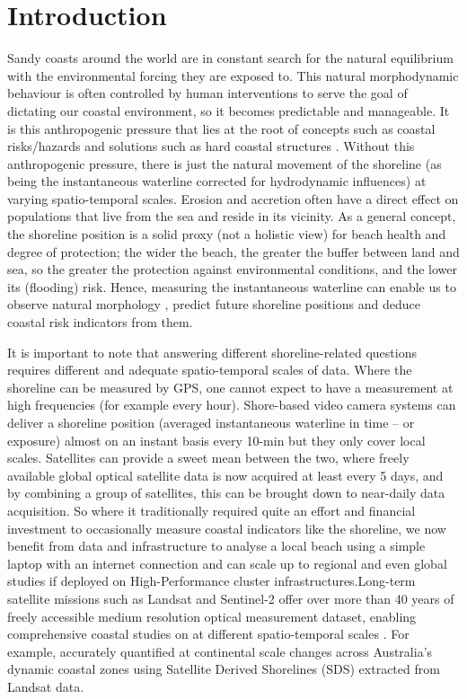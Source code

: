 \documentclass[remotesensing,technicalnote,submit,pdftex,moreauthors]{Definitions/mdpi}
\begin{document}
\section{Introduction}
Sandy coasts around the world are in constant search for the natural equilibrium with the environmental forcing they are exposed to. This natural morphodynamic behaviour is often controlled by human interventions to serve the goal of dictating our coastal environment, so it becomes predictable and manageable. It is this anthropogenic pressure that lies at the root of concepts such as coastal risks/hazards and solutions such as hard coastal structures \citep{Rashidi:2021}. Without this anthropogenic pressure, there is just the natural movement of the shoreline (as being the instantaneous waterline corrected for hydrodynamic influences) at varying spatio-temporal scales. Erosion and accretion often have a direct effect on populations that live from the sea and reside in its vicinity. As a general concept, the shoreline position is a solid proxy (not a holistic view) for beach health and degree of protection; the wider the beach, the greater the buffer between land and sea, so the greater the protection against environmental conditions, and the lower its (flooding) risk. Hence, measuring the instantaneous waterline can enable us to observe natural morphology \citep{Vitousek:17b}, predict future shoreline positions \citep{vitousek:23} and deduce coastal risk indicators from them.

It is important to note that answering different shoreline-related questions requires different and adequate spatio-temporal scales of data\cite{bergsma2022wave}. Where the shoreline can be measured by GPS, one cannot expect to have a measurement at high frequencies (for example every hour). Shore-based video camera systems can deliver a shoreline position (averaged instantaneous waterline in time -- or exposure) almost on an instant basis every 10-min but they only cover local scales. Satellites can provide a sweet mean between the two, where freely available global optical satellite data is now acquired at least every 5 days, and by combining a group of satellites, this can be brought down to near-daily data acquisition. So where it traditionally required quite an effort and financial investment to occasionally measure coastal indicators like the shoreline, we now benefit from data and infrastructure to analyse a local beach using a simple laptop with an internet connection and can scale up to regional and even global studies if deployed on High-Performance cluster infrastructures.Long-term satellite missions such as Landsat and Sentinel-2 offer over more than 40 years of freely accessible medium resolution optical measurement dataset, enabling comprehensive coastal studies on at different spatio-temporal scales \citep{Apostolopoulos:2021}. For example, \citep{BISHOPTAYLOR:2021} accurately quantified at continental scale changes across Australia's dynamic coastal zones using Satellite Derived Shorelines (SDS) extracted from Landsat data.
\end{document}
